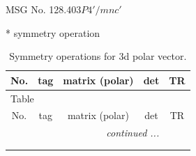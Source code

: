 \documentclass[fleqn,8pt]{jsarticle}
\begin{document}
\setcounter{MaxMatrixCols}{32}

\renewcommand{\tablename}{Table~}
\renewcommand{\figurename}{Figure~}
\begin{center}
\LARGE
MSG No. 128.403\quad$P4'/mnc'$
\end{center}
* symmetry operation
\renewcommand{\arraystretch}{1.3}
\begin{longtable}{ccccc}
\caption{Symmetry operations for 3d polar vector.}
 \\
 \hline \hline
No. & tag & matrix (polar) & det & TR \\ \hline \endfirsthead

\multicolumn{4}{l}{\tablename\ \thetable{}} \\
 \hline \hline
No. & tag & matrix (polar) & det & TR \\ \hline \endhead

 \hline \hline
\multicolumn{4}{r}{\footnotesize\it continued ...} \\ \endfoot

 \hline \hline
\multicolumn{4}{r}{} \\ \endlastfoot


\end{longtable}
\end{document}
